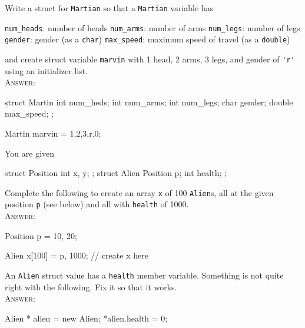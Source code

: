 

\renewcommand\AUTHOR{jdoe5@cougars.ccis.edu} %


\topmattertwo

\nextq
Write a struct for \verb!Martian! so that a \verb!Martian!
variable has
\begin{enumerate}[nosep]
\li \verb!num_heads!: number of heads
\li \verb!num_arms!: number of arms
\li \verb!num_legs!: number of legs
\li \verb!gender!: gender (as a \verb!char!)
\li \verb!max_speed!: maximum speed of travel (as a \verb!double!)
\end{enumerate}
and create struct variable \verb!marvin! with 1 head, 2 arms, 3 legs,
and gender of \verb!'r'! using an initializer list.
\\
\textsc{Answer:}\vspace{-2mm}
\begin{answercode}
struct Martin
{
        int num_heds;
        int num_arms;
        int num_legs;
        char gender;
        double max_speed;
};

Martin marvin = {1,2,3,r,0};
\end{answercode}

\nextq
You are given
\begin{console}[fontsize=\footnotesize]
struct Position
{
    int x, y;
};
struct Alien
{
    Position p;
    int health;
};
\end{console}
Complete the following to create an array \verb!x! of 100 \verb!Alien!s,
all at the given position \verb!p! (see below) and all with \verb!health!
of 1000.
\\
\textsc{Answer:}\vspace{-2mm}
\begin{answercode}
Position p = {10, 20};

Alien x[100] = {p, 1000};
// create x here
\end{answercode}

\nextq
An \verb!Alien! struct value has a \verb!health! member variable.
Something is not quite right with the following. Fix it so that it works.
\\
\textsc{Answer:}\vspace{-2mm}
\begin{answercode}
Alien * alien = new Alien;
*alien.health = 0; 
\end{answercode}

